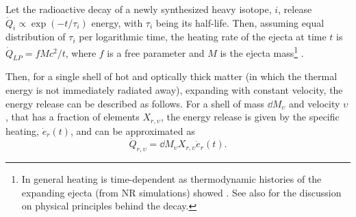 %
%



Let the radioactive decay of a newly synthesized heavy isotope, $i$, release 
$\dot{Q}_i \propto \exp(-t/\tau_i)$ energy, with $\tau_i$ being its half-life.
Then, assuming equal distribution of $\tau_i$ per logarithmic time, 
the heating rate of the ejecta at time $t$ is 
$\dot{Q}_{LP} = f M c^2 / t$,
where $f$ is a free parameter and $M$ is the ejecta mass\footnote{
    In general heating is time-dependent as thermodynamic histories of the expanding 
    ejecta (from \ac{NR} simulations) showed \citep{Metzger:2010,Roberts:2011,Korobkin:2012uy}.
    See also \citet{Hotokezaka:2017dbk} for the discussion on physical 
    principles behind the decay.
} \citep{Metzger:2019zeh}.
%




Then, for a single shell of hot and optically thick matter 
(in which the thermal energy is not immediately radiated away), 
expanding with constant velocity, 
the energy release 
can be described as follows.
For a shell of mass $\dd M_{\upsilon}$ and velocity $\upsilon$, that has a 
fraction of \rproc{} elements $X_{r,\upsilon}$, the energy release is 
given by the specific heating, $\dot{e}_r(t)$, and can be approximated as 
%
\begin{equation}
\dot{Q}_{r,\upsilon} = \dd M_{\upsilon}X_{r,\upsilon}\dot{e}_{r}(t).
\end{equation}
%

